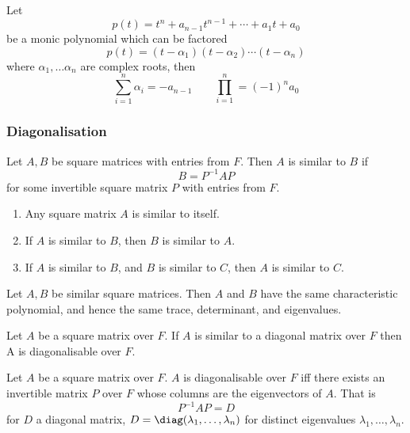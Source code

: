 \begin{lemma}
  Let
  \[ p(t) = t^n + a_{n-1}t^{n-1} + \cdots + a_1 t + a_0 \] be a monic
  polynomial which can be factored \[ p(t) =
  (t-\alpha_1)(t-\alpha_2)\cdots (t-\alpha_n) \] where $\alpha_1,
  \dots \alpha_n$ are complex roots, then
  \[ \sum_{i=1}^n \alpha_i = - a_{n-1} \qquad \prod_{i=1}^n = (-1)^n
  a_0 \]
\end{lemma}

\subsubsection{Diagonalisation}
\label{sec:diagonalisation}

\begin{definition}[Similarity]
  Let $A,B$ be square matrices with entries from $F$. Then $A$ is
  similar to $B$ if \[ B = P^{-1} A P \] for some invertible square
  matrix $P$ with entries from $F$.
\end{definition}

\begin{lemma}
  \begin{enumerate}
  \item Any square matrix $A$ is similar to itself.
  \item If $A$ is similar to $B$, then $B$ is similar to $A$.
  \item If $A$ is similar to $B$, and $B$ is similar to $C$, then $A$
    is similar to $C$.
  \end{enumerate}
\end{lemma}

\begin{lemma}
  Let $A, B$ be similar square matrices. Then $A$ and $B$ have the
  same characteristic polynomial, and hence the same trace,
  determinant, and eigenvalues.
\end{lemma}

\begin{definition}[Diagonalisability]
  Let $A$ be a square matrix over $F$. If $A$ is similar to a diagonal
  matrix over $F$ then A is diagonalisable over $F$.
\end{definition}

\begin{theorem}
  Let $A$ be a square matrix over $F$. $A$ is diagonalisable over $F$
  iff there exists an invertible matrix $P$ over $F$ whose columns are
  the eigenvectors of $A$. That is
  \[ P^{-1} A P = D \] for $D$ a diagonal matrix, $D =
  \diag(\lambda_1, \dots, \lambda_n)$ for distinct eigenvalues
  $\lambda_1, \dots, \lambda_n$.
\end{theorem}

